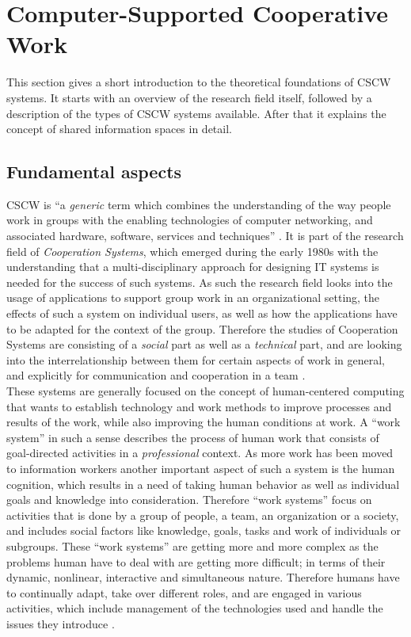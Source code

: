 
\section{Computer-Supported Cooperative Work}
\label{sec:cscw}

This section gives a short introduction to the theoretical foundations of \gls{CSCW} systems. It starts with an overview of the research field itself, followed by a description of the types of \gls{CSCW} systems available. After that it explains the concept of shared information spaces in detail.

\subsection{Fundamental aspects}
\label{sec:cscw_definition}

\gls{CSCW} is ``a \emph{generic} term which combines the understanding of the way people work in groups with the enabling technologies of computer networking, and associated hardware, software, services and techniques'' \citep[pg. 92]{borghoff2000computer}. It is part of the research field of \emph{Cooperation Systems}, which emerged during the early 1980s with the understanding that a multi-disciplinary approach for designing \gls{IT} systems is needed for the success of such systems. As such the research field looks into the usage of applications to support group work in an organizational setting, the effects of such a system on individual users, as well as how the applications have to be adapted for the context of the group. Therefore the studies of Cooperation Systems are consisting of a \emph{social} part as well as a \emph{technical} part, and are looking into the interrelationship between them for certain aspects of work in general, and explicitly for communication and cooperation in a team \citep{Grudin1994}. \\

These systems are generally focused on the concept of human-centered computing that wants to establish technology and work methods to improve processes and results of the work, while also improving the human conditions at work. A ``work system'' in such a sense describes the process of human work that consists of goal-directed activities in a \emph{professional} context. As more work has been moved to information workers another important aspect of such a system is the human cognition, which results in a need of taking human behavior as well as individual goals and knowledge into consideration. Therefore ``work systems'' focus on activities that is done by a group of people, a team, an organization or a society, and includes social factors like knowledge, goals, tasks and work of individuals or subgroups. These ``work systems'' are getting more and more complex as the problems human have to deal with are getting more difficult; in terms of their dynamic, nonlinear, interactive and simultaneous nature. Therefore humans have to continually adapt, take over different roles, and are engaged in various activities, which include management of the technologies used and handle the issues they introduce \citep{Hoffmann2009}. \\

